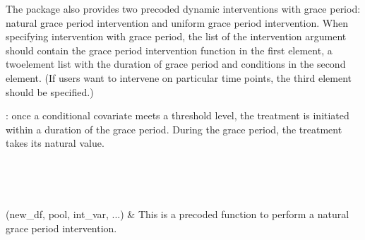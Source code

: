 \documentclass[letterpaper,10pt,english]{sphinxmanual}
\begin{document}
\sphinxAtStartPar
The package also provides two pre\sphinxhyphen{}coded dynamic interventions with grace period: natural grace period intervention
and uniform grace period intervention. When specifying intervention with grace period, the list of the intervention
argument should contain the grace period intervention function in the first element, a two\sphinxhyphen{}element list with the
duration of grace period and conditions in the second element. (If users want to intervene on particular
time points, the third element should be specified.)

\sphinxAtStartPar
{}: once a conditional covariate meets a threshold level, the treatment
is initiated within a duration of the grace period. During the grace period, the treatment takes its natural value.

\label{\detokenize{Specifications/Intervention:module-0}}

\begin{savenotes}\sphinxatlongtablestart\begin{longtable}[c]{}
\hline

\endfirsthead

%
{}\\
\hline

\endhead

\hline
{}\\
\endfoot

\endlastfoot

\sphinxAtStartPar
{\hyperref[\detokenize{Specifications/Intervention:pygformula.parametric_gformula.interventions.natural_grace_period}]{}}(new\_df, pool, int\_var, ...)
&
\sphinxAtStartPar
This is a pre\sphinxhyphen{}coded function to perform a natural grace period intervention.
\\
\hline
\end{longtable}\sphinxatlongtableend\end{savenotes}
\end{document}
